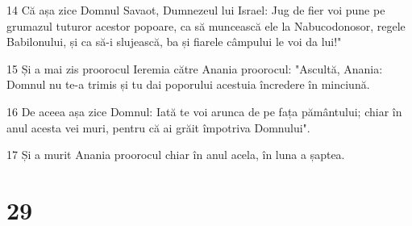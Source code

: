 \par 14 Că așa zice Domnul Savaot, Dumnezeul lui Israel: Jug de fier voi pune pe grumazul tuturor acestor popoare, ca să muncească ele la Nabucodonosor, regele Babilonului, și ca să-i slujească, ba și fiarele câmpului le voi da lui!"
\par 15 Și a mai zis proorocul Ieremia către Anania proorocul: "Ascultă, Anania: Domnul nu te-a trimis și tu dai poporului acestuia încredere în minciună.
\par 16 De aceea așa zice Domnul: Iată te voi arunca de pe fața pământului; chiar în anul acesta vei muri, pentru că ai grăit împotriva Domnului".
\par 17 Și a murit Anania proorocul chiar în anul acela, în luna a șaptea.

\chapter{29}

